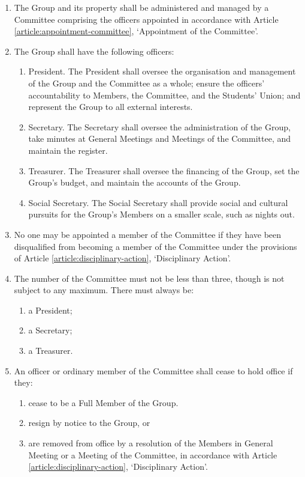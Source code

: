 \documentclass[12pt]{constitution}
\begin{document}
\begin{enumerate}
    \item The Group and its property shall be administered and managed by a Committee comprising the officers appointed in accordance with Article \ref{article:appointment-committee}, `Appointment of the Committee'.
    \item The Group shall have the following officers:
    \begin{enumerate}
        \item President. The President shall oversee the organisation and management of the Group and the Committee as a whole; ensure the officers' accountability to Members, the Committee, and the Students' Union; and represent the Group to all external interests.
        \item Secretary. The Secretary shall oversee the administration of the Group, take minutes at General Meetings and Meetings of the Committee, and maintain the register.
        \item Treasurer. The Treasurer shall oversee the financing of the Group, set the Group's budget, and maintain the accounts of the Group.
        \item Social Secretary. The Social Secretary shall provide social and cultural pursuits for the Group’s Members on a smaller scale, such as nights out.

    \end{enumerate}

    \item No one may be appointed a member of the Committee if they have been disqualified from becoming a member of the Committee under the provisions of Article \ref{article:disciplinary-action}, `Disciplinary Action'.
    \item The number of the Committee must not be less than three, though is not subject to any maximum. There must always be:
    \begin{enumerate}
        \item a President;
        \item a Secretary;
        \item a Treasurer.
    \end{enumerate}

    \item An officer or ordinary member of the Committee shall cease to hold office if they:
    \begin{enumerate}
        \item cease to be a Full Member of the Group.
        \item resign by notice to the Group, or
        \item are removed from office by a resolution of the Members in General Meeting or a Meeting of the Committee, in accordance with Article \ref{article:disciplinary-action}, `Disciplinary Action'.
    \end{enumerate}
\end{enumerate}
\end{document}

